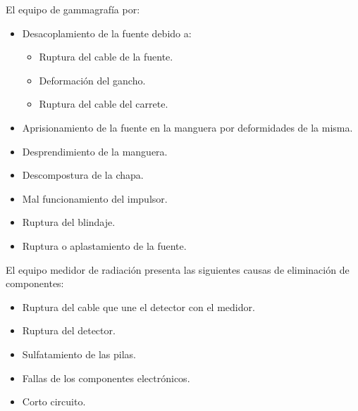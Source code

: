 El equipo de gammagrafía por:

\begin{itemize}
  \item Desacoplamiento de la fuente debido a:
  \begin{itemize}
    \item Ruptura del cable de la fuente.
    \item Deformación del gancho.
    \item Ruptura del cable del carrete.
  \end{itemize}
  \item Aprisionamiento de la fuente en la manguera por deformidades de la misma.
  \item Desprendimiento de la manguera.
  \item Descompostura de la chapa.
  \item Mal funcionamiento del impulsor.
  \item Ruptura del blindaje.
  \item Ruptura o aplastamiento de la fuente.
\end{itemize}

El equipo medidor de radiación presenta las siguientes causas de eliminación de componentes:

\begin{itemize}
  \item Ruptura del cable que une el detector con el medidor.
  \item Ruptura del detector.
  \item Sulfatamiento de las pilas.
    \item Fallas de los componentes electrónicos.
    \item Corto circuito.
\end{itemize}
